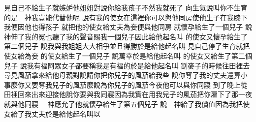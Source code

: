 \bchapter%
見自己不給生子\chientien 就嫉妒他姐姐\chientien 對說\chientien 你給我孩子\chientien 不然我就死了\chuan 
{}向生氣\chientien 說\chientien 叫你不生育的是　神\chientien 我豈能代替他呢\chuan 
{}說\chientien 有我的使女在這裡\chientien 你可以與他同房\chientien 使他生子在我膝下\chientien 我便因他也得孩子\chuan{}
就把他的使女給丈夫為妾\chientien{}便與他同房\chuan 
{}就懷孕給生了一個兒子\chuan 
{}說\chientien 　神伸了我的冤\chientien 也聽了我的聲音\chientien 賜我一個兒子\chientien 因此給他起名叫\chuan{}
的使女又懷孕\chientien 給生了第二個兒子\chuan 
{}說\chientien 我與我姐姐大大相爭\chientien 並且得勝\yuentien 於是給他起名叫\chuan{}\Chuan
{}見自己停了生育\chientien 就把使女給為妾\yuentien 
{}的使女給生了一個兒子\yuentien 
{}說\chientien 萬幸\chientien 於是給他起名叫\chuan{}\linebreak{}
的使女又給生了第二個兒子\yuentien 
{}說\chientien 我有福阿\chientien 眾女子都要稱我是有福的\yuentien 於是給他起名叫\chuan{}\Chuan
{}割麥子的時候\chientien{}往田裡去尋見風茄\chientien 拿來給他母親\yuentien{}對說\chientien 請你把你兒子的風茄給我些\chuan 
{}說\chientien 你奪了我的丈夫還算小事麼\chientien 你又要奪我兒子的風茄麼\chuan{}說\chientien 為你兒子的風茄\chientien 今夜他可以與你同寢\chuan 
{}到了晚上\chientien{}從田裡回來\chientien{}出來迎接他\chientien 說\chientien 你要與我同寢\chientien 因為我實在用我兒子的風茄\chientien 把你雇下了\chuan 那一夜就與他同寢\yuentien 
{}　神應允了\chientien 他就懷孕\chientien 給生了第五個兒子\chuan 
{}說\chientien 　神給了我價值\chientien 因為我把使女給了我丈夫\yuentien 於是給他起名叫以\chuan{}
